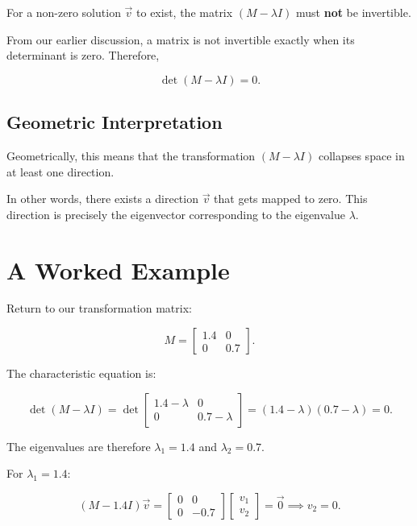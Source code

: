 \documentclass[11pt,openany]{book}
\theoremstyle{definition}
\begin{document}
For a non-zero solution $\vec{v}$ to exist, the matrix $(M - \lambda I)$ must \textbf{not} be invertible.

\medskip

From our earlier discussion, a matrix is not invertible exactly when its determinant is zero. Therefore,

\[
\det(M - \lambda I) = 0.
\]

\medskip

\subsection{Geometric Interpretation}

Geometrically, this means that the transformation $(M - \lambda I)$ collapses space in at least one direction.

\medskip

In other words, there exists a direction $\vec{v}$ that gets mapped to zero. 
This direction is precisely the eigenvector corresponding to the eigenvalue $\lambda$.

\section{A Worked Example}

Return to our transformation matrix:

\[
M = \begin{bmatrix} 1.4 & 0 \\ 0 & 0.7 \end{bmatrix}.
\]

The characteristic equation is:

\[
\det(M - \lambda I) 
= \det\begin{bmatrix} 1.4 - \lambda & 0 \\ 0 & 0.7 - \lambda \end{bmatrix}
= (1.4 - \lambda)(0.7 - \lambda) = 0.
\]

The eigenvalues are therefore $\lambda_1 = 1.4$ and $\lambda_2 = 0.7$.

\medskip

For $\lambda_1 = 1.4$:

\[
(M - 1.4I)\vec{v} = 
\begin{bmatrix} 0 & 0 \\ 0 & -0.7 \end{bmatrix}
\begin{bmatrix} v_1 \\ v_2 \end{bmatrix} = \vec{0}
\implies v_2 = 0.
\]
\end{document}
